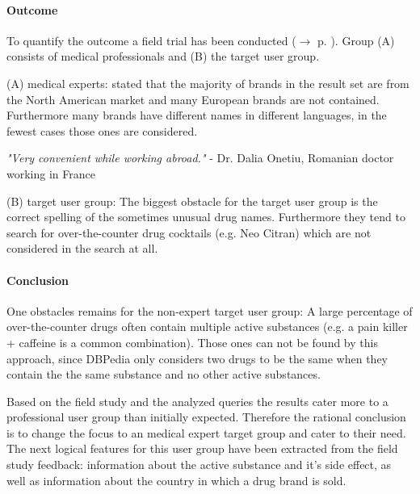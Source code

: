 \documentclass[11pt,titlepage,oneside,openany]{book}
\begin{document}
\paragraph{Outcome}
\label{outcome}
To quantify the outcome a field trial has been conducted ($\rightarrow$ p. \pageref{cha:field_trial}). Group (A) consists of medical professionals and (B) the target user group.

(A) medical experts: stated that the majority of brands in the result set are from the North American market and many European brands are not contained. Furthermore many brands have different names in different languages, in the fewest cases those ones are considered.

\begin{center}
\textit{"Very convenient while working abroad."}\linebreak
- Dr. Dalia Onetiu, Romanian doctor working in France
\end{center}

(B) target user group: The biggest obstacle for the target user group is the correct spelling of the sometimes unusual drug names. Furthermore they tend to search for over-the-counter drug cocktails (e.g. Neo Citran) which are not considered in the search at all.

\paragraph{Conclusion}
\label{conclusion}

One obstacles remains for the non-expert target user group: 
A large percentage of over-the-counter drugs often contain multiple active substances (e.g. a pain killer + caffeine is a common combination). Those ones can not be found by this approach, since DBPedia only considers two drugs to be the same when they contain the the same substance and no other active substances.

Based on the field study and the analyzed queries the results cater more to a professional user group than initially expected. Therefore the rational conclusion is to change the focus to an medical expert target group and cater to their need. The next logical features for this user group have been extracted from the field study feedback: information about the active substance and it's side effect, as well as information about the country in which a drug brand is sold.


\end{document}
